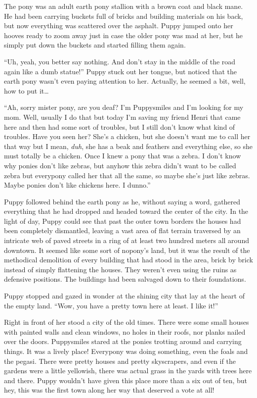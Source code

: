 The pony was an adult earth pony stallion with a brown coat and black mane. He had been carrying buckets full of bricks and building materials on his back, but now everything was scattered over the asphalt. Puppy jumped onto her hooves ready to zoom away just in case the older pony was mad at her, but he simply put down the buckets and started filling them again.

``Uh, yeah, you better say nothing. And don't stay in the middle of the road again like a dumb statue!'' Puppy stuck out her tongue, but noticed that the earth pony wasn't even paying attention to her. Actually, he seemed a bit, well, how to put it\dots

``Ah, sorry mister pony, are you deaf? I'm Puppysmiles and I'm looking for my mom. Well, usually I do that but today I'm saving my friend Henri that came here and then had some sort of troubles, but I still don't know what kind of troubles. Have you seen her? She's a chicken, but she doesn't want me to call her that way but I mean, \emph{duh}, she has a beak and feathers and everything else, so she must totally be a chicken. Once I knew a pony that was a zebra. I don't know why ponies don't like zebras, but anyhow this zebra didn't want to be called zebra but everypony called her that all the same, so maybe she's just like zebras. Maybe ponies don't like chickens here. I dunno.''

Puppy followed behind the earth pony as he, without saying a word, gathered everything that he had dropped and headed toward the center of the city. In the light of day, Puppy could see that past the outer town borders the houses had been completely dismantled, leaving a vast area of flat terrain traversed by an intricate web of paved streets in a ring of at least two hundred meters all around downtown. It seemed like some sort of nopony's land, but it was the result of the methodical demolition of every building that had stood in the area, brick by brick instead of simply flattening the houses. They weren't even using the ruins as defensive positions. The buildings had been salvaged down to their foundations.

Puppy stopped and gazed in wonder at the shining city that lay at the heart of the empty land. ``Wow, you have a pretty town here at least. I like it!''

Right in front of her stood a city of the old times. There were some small houses with painted walls and clean windows, no holes in their roofs, nor planks nailed over the doors. Puppysmiles stared at the ponies trotting around and carrying things. It was a lively place! Everypony was doing something, even the foals and the pegasi. There were pretty houses and pretty skyscrapers, and even if the gardens were a little yellowish, there was actual grass in the yards with trees here and there. Puppy wouldn't have given this place more than a six out of ten, but hey, this was the first town along her way that deserved a vote at all!

